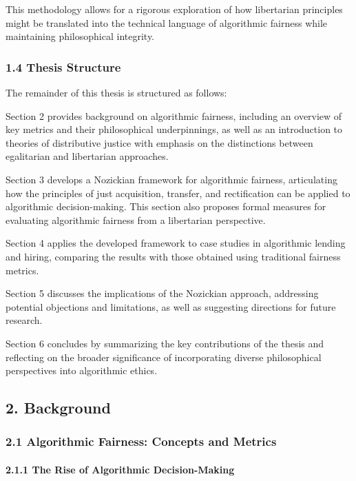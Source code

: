 This methodology allows for a rigorous exploration of how libertarian
principles might be translated into the technical language of
algorithmic fairness while maintaining philosophical integrity.

\subsubsection{1.4 Thesis Structure}\label{thesis-structure}

The remainder of this thesis is structured as follows:

Section 2 provides background on algorithmic fairness, including an
overview of key metrics and their philosophical underpinnings, as well
as an introduction to theories of distributive justice with emphasis on
the distinctions between egalitarian and libertarian approaches.

Section 3 develops a Nozickian framework for algorithmic fairness,
articulating how the principles of just acquisition, transfer, and
rectification can be applied to algorithmic decision-making. This
section also proposes formal measures for evaluating algorithmic
fairness from a libertarian perspective.

Section 4 applies the developed framework to case studies in algorithmic
lending and hiring, comparing the results with those obtained using
traditional fairness metrics.

Section 5 discusses the implications of the Nozickian approach,
addressing potential objections and limitations, as well as suggesting
directions for future research.

Section 6 concludes by summarizing the key contributions of the thesis
and reflecting on the broader significance of incorporating diverse
philosophical perspectives into algorithmic ethics.

\subsection{2. Background}\label{background}

\subsubsection{2.1 Algorithmic Fairness: Concepts and
Metrics}\label{algorithmic-fairness-concepts-and-metrics}

\paragraph{2.1.1 The Rise of Algorithmic
Decision-Making}\label{the-rise-of-algorithmic-decision-making}

